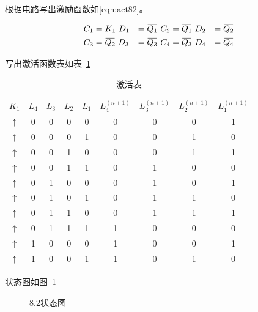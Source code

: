 \documentclass[a4paper,twoside]{ctexart}
\newcommand{\ols}[1]{\mskip.5\thinmuskip\overline{\mskip-.5\thinmuskip {#1} \mskip-.5\thinmuskip}\mskip.5\thinmuskip}
\begin{document}
\begin{spacing}{1.2}
根据电路写出激励函数如\eqref{eqn:act82}。

\begin{equation}
	\label{eqn:act82}
	\begin{aligned}
		C_1&=K_1 \
		D_1&=\ols{Q_1} \
		C_2&=\ols{Q_1} \
		D_2&=\ols{Q_2}\\
		C_3&=\ols{Q_2}\
		D_3&=\ols{Q_3}\
		C_4&=\ols{Q_3}\
		D_4&=\ols{Q_4}
	\end{aligned}
\end{equation}

写出激活函数表如表~\ref{tbl:act82}

\begin{table}[htb]
	\centering
	\caption{激活表}
	\label{tbl:act82}
	\begin{tabular}{c|cccc|cccc}
		\toprule
		\hline
		$K_1$&$L_4$&$L_3$&$L_2$&$L_1$&$L_4^{(n+1)}$&$L_3^{(n+1)}$&$L_2^{(n+1)}$&$L_1^{(n+1)}$ \\
		\hline
		$\uparrow$&0&0&0&0&0&0&0&1\\
		$\uparrow$&0&0&0&1&0&0&1&0\\
		$\uparrow$&0&0&1&0&0&0&1&1\\
		$\uparrow$&0&0&1&1&0&1&0&0\\
		$\uparrow$&0&1&0&0&0&1&0&1\\
		$\uparrow$&0&1&0&1&0&1&1&0\\
		$\uparrow$&0&1&1&0&0&1&1&1\\
		$\uparrow$&0&1&1&1&1&0&0&0\\
		$\uparrow$&1&0&0&0&1&0&0&1\\
		$\uparrow$&1&0&0&1&1&0&1&0\\
		\hline
		\bottomrule
		
	\end{tabular}
\end{table}

状态图如图~\ref{fig:82}

\begin{figure}[H]
	\centering
	\caption{8.2状态图}
	\label{fig:82}
\end{figure}
\end{spacing}
\end{document}
